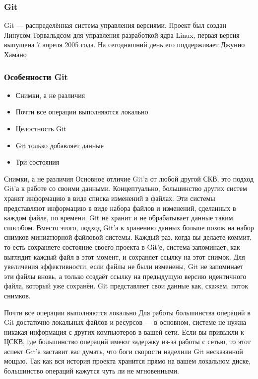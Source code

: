\documentclass{../industrial-development}
\begin{document}
\begin{frame} \frametitle{Git}
  \begin{block}{}
    \alert{Git} --- распределённая система управления версиями. Проект был создан Линусом Торвальдсом для управления разработкой ядра Linux, первая версия выпущена 7 апреля 2005 года. На сегодняшний день его поддерживает Джунио Хамано
  \end{block}
\end{frame}

\begin{frame} \frametitle{Особенности Git}
  \begin{itemize}
  \item Снимки, а не различия
  \item Почти все операции выполняются локально
  \item Целостность Git
  \item Git только добавляет данные
  \item Три состояния
  \end{itemize}
\end{frame}

\lecturenotes

Снимки, а не различия
Основное отличие Git’а от любой другой СКВ, это подход Git’а к работе со своими данными. Концептуально, большинство других систем хранят информацию в виде списка изменений в файлах. Эти системы представляют информацию в виде набора файлов и изменений, сделанных в каждом файле, по времени. 
Git не хранит и не обрабатывает данные таким способом. Вместо этого, подход Git’а к хранению данных больше похож на набор снимков миниатюрной файловой системы. Каждый раз, когда вы делаете коммит, то есть сохраняете состояние своего проекта в Git’е, система запоминает, как выглядит каждый файл в этот момент, и сохраняет ссылку на этот снимок. Для увеличения эффективности, если файлы не были изменены, Git не запоминает эти файлы вновь, а только создаёт ссылку на предыдущую версию идентичного файла, который уже сохранён. Git представляет свои данные как, скажем, поток снимков.

Почти все операции выполняются локально
Для работы большинства операций в Git достаточно локальных файлов и ресурсов — в основном, системе не нужна никакая информация с других компьютеров в вашей сети. Если вы привыкли к ЦСКВ, где большинство операций имеют задержку из-за работы с сетью, то этот аспект Git’а заставит вас думать, что боги скорости наделили Git несказанной мощью. Так как вся история проекта хранится прямо на вашем локальном диске, большинство операций кажутся чуть ли не мгновенными.
\end{document}
